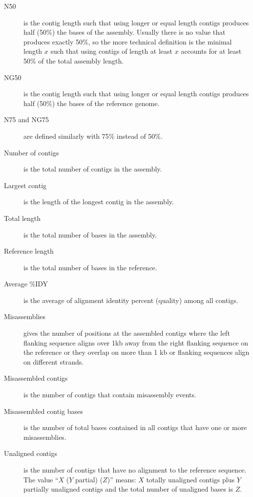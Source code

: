\documentclass{article}
\begin{document}
\begin{description}
\item[N50] is the contig length such that using longer or equal length contigs
produces half (50\%) the bases of the assembly.  Usually there is no
value that produces exactly 50\%, so the more technical definition is
the minimal length $x$ such that using contigs of length at least $x$ accounts for at least 50\% of the total assembly length.

\item[NG50] is the contig length such that using longer or equal length contigs
produces half (50\%) the bases of the reference genome.

\item[N75 and NG75] are defined similarly with 75\% instead of 50\%.

\item[Number of contigs] is the total number of contigs in the assembly.

\item[Largest contig] is the length of the longest contig in the assembly.

\item[Total length] is the total number of bases in the assembly.

\item[Reference length] is the total number of bases in the reference.

\item[Average \%IDY] is the average of alignment identity percent (quality) among all contigs.

\item[Misassemblies] gives the number of positions at the assembled contigs where the left
flanking sequence aligns over 1kb away from the right flanking sequence on the
reference or they overlap on more than 1 kb or flanking sequences align on different strands.

\item[Misassembled contigs] is the number of contigs that contain misassembly
events.

\item[Misassembled contig bases] is the number of total bases contained in all
contigs that have one or more misassemblies.

\item[Unaligned contigs] is the number of contigs that have no alignment to the
reference sequence.  The value ``$X$ ($Y$ partial) ($Z$)'' means:
$X$ totally unaligned contigs
plus $Y$ partially unaligned contigs
and the total number of unaligned bases is $Z$.


\end{description}
\end{document}
